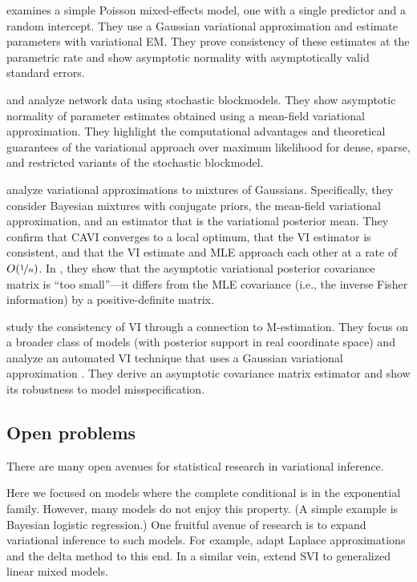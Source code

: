 \documentclass{article}
\begin{document}
\citet{Hall:2011} examines a simple Poisson mixed-effects model, one
with a single predictor and a random intercept. They use a Gaussian
variational approximation and estimate parameters with variational
\gls{EM}.  They prove consistency of these estimates at the parametric
rate and show asymptotic normality with asymptotically valid standard
errors.

\citet{celisse2012consistency} and \citet{bickel2013asymptotic}
analyze network data using stochastic blockmodels. They show
asymptotic normality of parameter estimates obtained using a
mean-field variational approximation. They highlight the computational
advantages and theoretical guarantees of the variational approach over
maximum likelihood for dense, sparse, and restricted variants of the
stochastic blockmodel.

\citet{Wang:2006} analyze variational approximations to mixtures of
Gaussians. Specifically, they consider Bayesian mixtures with
conjugate priors, the mean-field variational approximation, and an
estimator that is the variational posterior mean. They confirm that
\gls{CAVI} converges to a local optimum, that the \gls{VI} estimator
is consistent, and that the \gls{VI} estimate and \gls{MLE} approach
each other at a rate of $O(\nicefrac{1}{n})$. In \citet{Wang:2005}, they show
that the asymptotic variational posterior covariance matrix is ``too
small''---it differs from the \gls{MLE} covariance (i.e., the inverse
Fisher information) by a positive-definite matrix.

\citet{westling2015establishing} study the consistency of \gls{VI}
through a connection to M-estimation. They focus on a broader class of
models (with posterior support in real coordinate space) and analyze
an automated \gls{VI} technique that uses a Gaussian variational
approximation \citep{kucukelbir2015automatic}. They derive an
asymptotic covariance matrix estimator and show its robustness to
model misspecification.
 
\subsection{Open problems}
\label{sec:open-problems}

There are many open avenues for statistical research in variational
inference.

Here we focused on models where the complete conditional is in the
exponential family.  However, many models do not enjoy this property.
(A simple example is Bayesian logistic regression.)  One fruitful
avenue of research is to expand variational inference to such models.
For example, \citet{Wang:2013} adapt Laplace approximations and the
delta method to this end. In a similar vein, \citet{tan2014stochastic}
extend \gls{SVI} to generalized linear mixed models.
\end{document}
